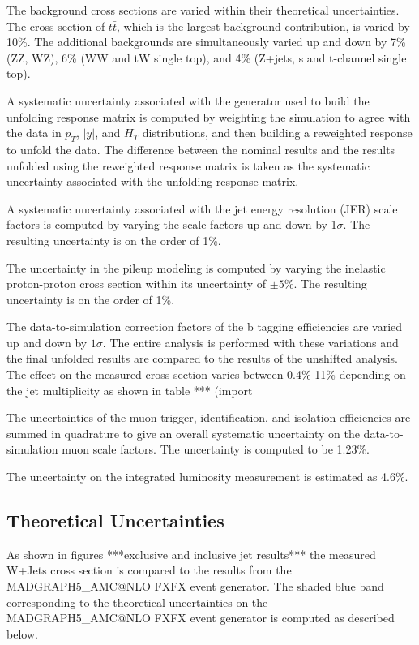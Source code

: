 \documentclass[oneside, letterpaper, oldfontcommands]{memoir}
\begin{document}
{{{\qquad The background cross sections are varied within their theoretical uncertainties. The cross section of $t\bar{t}$, which is the largest background contribution, is varied by 10\%. The additional backgrounds are simultaneously varied up and down by 7\% (ZZ, WZ), 6\% (WW and tW single top), and 4\% (Z+jets, s and t-channel single top). 

\qquad A systematic uncertainty associated with the generator used to build the unfolding response matrix is computed by weighting the simulation to agree with the data in $p_{T}$, $|y|$, and $H_{T}$ distributions, and then building a reweighted response to unfold the data. The difference between the nominal results and the results unfolded using the reweighted response matrix is taken as the systematic uncertainty associated with the unfolding response matrix.

\qquad A systematic uncertainty associated with the jet energy resolution (JER) scale factors is computed by varying the scale factors up and down by 1$\sigma$. The resulting uncertainty is on the order of 1\%.

\qquad The uncertainty in the pileup modeling is computed by varying the inelastic proton-proton cross section within its uncertainty of $\pm 5\%$. The resulting uncertainty is on the order of 1\%.

\qquad The data-to-simulation correction factors of the b tagging efficiencies are varied up and down by $1 \sigma$. The entire analysis is performed with these variations and the final unfolded results are compared to the results of the unshifted analysis. The effect on the measured cross section varies between 0.4\%-11\% depending on the jet multiplicity as shown in table *** (import

\qquad The uncertainties of the muon trigger, identification, and isolation efficiencies are summed in quadrature to give an overall systematic uncertainty on the data-to-simulation muon scale factors. The uncertainty is computed to be 1.23\%.

\qquad The uncertainty on the integrated luminosity measurement is estimated as 4.6\%.

\subsection{Theoretical Uncertainties}
\qquad As shown in figures ***exclusive and inclusive jet results*** the measured W+Jets cross section is compared to the results from the MADGRAPH5_AMC@NLO FXFX event generator. The shaded blue band corresponding to the theoretical uncertainties on the MADGRAPH5_AMC@NLO FXFX event generator is computed as described below.

}}}
\end{document}

